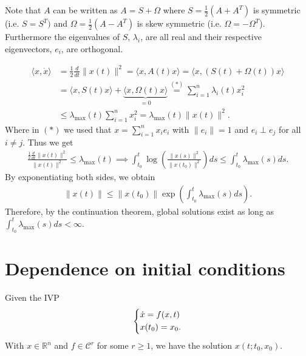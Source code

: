 \begin{remark}[]
	Note that ${A} $ can be written as ${A}={S} +{\Omega }$ where ${S} = \frac{1}{2}({A} + {A}^T)$ is symmetric (i.e. ${S} = {S}^T)$ and ${\Omega} = \frac{1}{2}({A} - {A}^T)$ is skew symmetric (i.e. ${\Omega} = -{\Omega}^T$). Furthermore the eigenvalues of ${S}$, $\lambda_i$, are all real and their respective eigenvectors, $e_i$, are orthogonal.
\end{remark}

\begin{ex}
	\begin{subequations}\begin{align}
	\langle  {x}, \dot{ {x}} \rangle &= \frac{1}{2} \frac{d}{dt}  \| {x}(t) \|^2 = \langle  {x}, {A}(t)  {x}\rangle = \langle  {x}, ({S}(t) + {\Omega}(t) )  {x} \rangle \\
				   &= \langle  {x}, S(t)  {x} \rangle + \underbrace{\langle  {x}, {\Omega}(t)  {x} \rangle}_{=0} \stackrel{(*)}{=} 
				   \sum_{i=1}^{n} \lambda_i(t) x_i^2 \\
				   &\leq \lambda_{ \textrm{max} }(t) \sum_{i=1}^{n} x_i^2 = \lambda _{ \textrm{max} }(t)  \|  {x}(t) \|^2.
\end{align}\end{subequations}
Where in $(*)$ we used that $ {x} = \sum_{i=1}^{n} x_i  {e}_i $ with $ \| {e}_i \|=1$ and $ {e}_i \perp  {e}_j$ for all $i \neq j$. Thus we get
\begin{align}
	\frac{\frac{1}{2}\frac{d}{dt} \| {x}(t) \|^2}{ \| {x}(t) \|^2} \leq \lambda_{ \textrm{max} }(t) 
	\implies \int_{t_0}^{t} \log \left( \frac{ \| {x}(s) \|^2}{ \| {x}(t_0) \|^2} \right) ds \leq \int_{t_0}^{t}  \lambda _{ \textrm{max} }(s) ds.
\end{align}
By exponentiating both sides, we obtain
\begin{align}
\boxed{  \| {x}(t) \| \leq  \| {x}(t_0)  \| \exp\left(\int_{t_0}^{t} \lambda_{ \textrm{max} }(s)ds\right).}
\end{align}
Therefore, by the continuation theorem, global solutions exist as long as $\int_{t_0}^{t} \lambda_{ \textrm{max} }(s) ds < \infty $.
\end{ex}

\section{Dependence on initial conditions}
Given the IVP
\begin{align}
	\begin{dcases}
	\dot{ {x}} = f( {x},t) \\  {x}(t_0) =  {x}_0.
	\end{dcases}
\end{align}
With $ {x} \in \mathbb{R}^{n}$ and $f\in \mathcal{C}^r$ for some $r\geq 1$, we have the solution $ {x}(t; t_0,  {x}_0)$.

